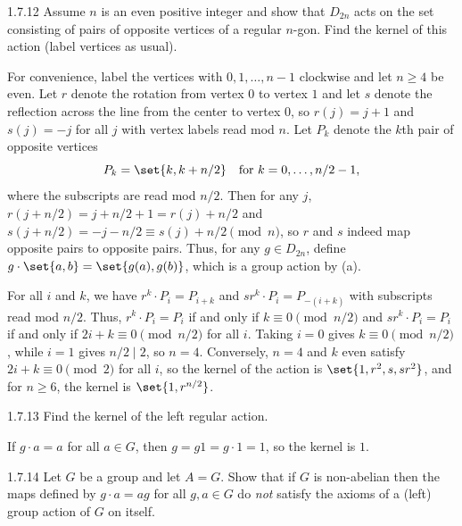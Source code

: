 \begin{exercise}{1.7.12}
    Assume $n$ is an even positive integer and show that $D_{2n}$ acts on the set consisting of pairs of opposite vertices of a regular $n$-gon.
	Find the kernel of this action (label vertices as usual).
\end{exercise}

\begin{sol}
    For convenience, label the vertices with $0, 1, \ldots, n - 1$ clockwise and let $n \geq 4$ be even.
    Let $r$ denote the rotation from vertex $0$ to vertex $1$ and let $s$ denote the reflection across the line from the center to vertex $0$, so $r(j) = j + 1$ and $s(j) = -j$ for all $j$ with vertex labels read mod $n$.
    Let $P_k$ denote the $k$th pair of opposite vertices
    \[
        P_k = \set{k, k + n/2} \quad \text{for } k = 0, \ldots, n/2 - 1,
    \]
    where the subscripts are read mod $n/2$.
    Then for any $j$, $r(j + n/2) = j + n/2 + 1 = r(j) + n/2$ and $s(j + n/2) = -j - n/2 \equiv s(j) + n/2 \pmod{n}$, so $r$ and $s$ indeed map opposite pairs to opposite pairs.
    Thus, for any $g \in D_{2n}$, define $g \cdot \set{a, b} = \set{g(a), g(b)}$, which is a group action by (a).
    
    For all $i$ and $k$, we have $r^k \cdot P_i = P_{i + k}$ and $sr^k \cdot P_i = P_{-(i + k)}$ with subscripts read mod $n/2$.
    Thus, $r^k \cdot P_i = P_i$ if and only if $k \equiv 0 \pmod{n/2}$ and $sr^k \cdot P_i = P_i$ if and only if $2i + k \equiv 0 \pmod{n/2}$ for all $i$.
    Taking $i = 0$ gives $k \equiv 0 \pmod{n/2}$, while $i = 1$ gives $n/2 \mid 2$, so $n = 4$.
    Conversely, $n = 4$ and $k$ even satisfy $2i + k \equiv 0 \pmod{2}$ for all $i$, so the kernel of the action is $\set{1, r^2, s, sr^2}$, and for $n \geq 6$, the kernel is $\set{1, r^{n/2}}$.
\end{sol}

\begin{exercise}{1.7.13}
    Find the kernel of the left regular action.
\end{exercise}

\begin{sol}
    If $g \cdot a = a$ for all $a \in G$, then $g = g1 = g \cdot 1 = 1$, so the kernel is $1$.
\end{sol}

\begin{exercise}{1.7.14}
    Let $G$ be a group and let $A = G$.
	Show that if $G$ is non-abelian then the maps defined by $g \cdot a = ag$ for all $g, a \in G$ do \emph{not} satisfy the axioms of a (left) group action of $G$ on itself.
\end{exercise}

